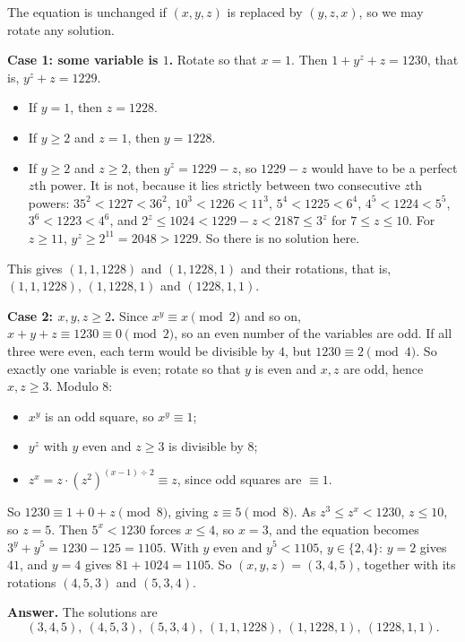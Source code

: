 The equation is unchanged if $(x,y,z)$ is replaced by $(y,z,x)$, so we may rotate any solution.

\textbf{Case 1: some variable is $1$.} Rotate so that $x=1$. Then $1+y^z+z=1230$, that is, $y^z+z=1229$.
\begin{itemize}
\item If $y=1$, then $z=1228$.
\item If $y\ge2$ and $z=1$, then $y=1228$.
\item If $y\ge2$ and $z\ge2$, then $y^z=1229-z$, so $1229-z$ would have to be a perfect $z$th power. It is not, because it lies strictly between two consecutive $z$th powers: $35^2<1227<36^2$, $10^3<1226<11^3$, $5^4<1225<6^4$, $4^5<1224<5^5$, $3^6<1223<4^6$, and $2^z\le1024<1229-z<2187\le3^z$ for $7\le z\le10$. For $z\ge11$, $y^z\ge2^{11}=2048>1229$. So there is no solution here.
\end{itemize}
This gives $(1,1,1228)$ and $(1,1228,1)$ and their rotations, that is, $(1,1,1228)$, $(1,1228,1)$ and $(1228,1,1)$.

\textbf{Case 2: $x,y,z\ge2$.} Since $x^y\equiv x\pmod2$ and so on, $x+y+z\equiv1230\equiv0\pmod2$, so an even number of the variables are odd. If all three were even, each term would be divisible by $4$, but $1230\equiv2\pmod4$. So exactly one variable is even; rotate so that $y$ is even and $x,z$ are odd, hence $x,z\ge3$. Modulo $8$:
\begin{itemize}
\item $x^y$ is an odd square, so $x^y\equiv1$;
\item $y^z$ with $y$ even and $z\ge3$ is divisible by $8$;
\item $z^x=z\cdot\left(z^2\right)^{(x-1)\div2}\equiv z$, since odd squares are $\equiv1$.
\end{itemize}
So $1230\equiv1+0+z\pmod8$, giving $z\equiv5\pmod8$. As $z^3\le z^x<1230$, $z\le10$, so $z=5$. Then $5^x<1230$ forces $x\le4$, so $x=3$, and the equation becomes $3^y+y^5=1230-125=1105$. With $y$ even and $y^5<1105$, $y\in\{2,4\}$: $y=2$ gives $41$, and $y=4$ gives $81+1024=1105$. So $(x,y,z)=(3,4,5)$, together with its rotations $(4,5,3)$ and $(5,3,4)$.

\textbf{Answer.} The solutions are
\[(3,4,5),\ (4,5,3),\ (5,3,4),\ (1,1,1228),\ (1,1228,1),\ (1228,1,1).\]
